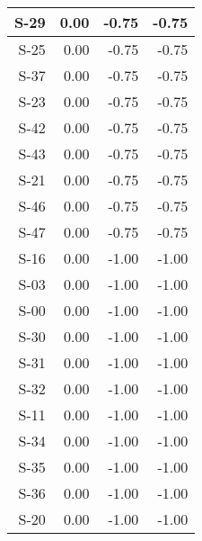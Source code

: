 \begin{tabular}{ | r | r | r | r | }
    \hline
                  S-29  &            0.00  &           -0.75  &           -0.75  \\
    \hline
                  S-25  &            0.00  &           -0.75  &           -0.75  \\
    \hline
                  S-37  &            0.00  &           -0.75  &           -0.75  \\
    \hline
                  S-23  &            0.00  &           -0.75  &           -0.75  \\
    \hline
                  S-42  &            0.00  &           -0.75  &           -0.75  \\
    \hline
                  S-43  &            0.00  &           -0.75  &           -0.75  \\
    \hline
                  S-21  &            0.00  &           -0.75  &           -0.75  \\
    \hline
                  S-46  &            0.00  &           -0.75  &           -0.75  \\
    \hline
                  S-47  &            0.00  &           -0.75  &           -0.75  \\
    \hline
                  S-16  &            0.00  &           -1.00  &           -1.00  \\
    \hline
                  S-03  &            0.00  &           -1.00  &           -1.00  \\
    \hline
                  S-00  &            0.00  &           -1.00  &           -1.00  \\
    \hline
                  S-30  &            0.00  &           -1.00  &           -1.00  \\
    \hline
                  S-31  &            0.00  &           -1.00  &           -1.00  \\
    \hline
                  S-32  &            0.00  &           -1.00  &           -1.00  \\
    \hline
                  S-11  &            0.00  &           -1.00  &           -1.00  \\
    \hline
                  S-34  &            0.00  &           -1.00  &           -1.00  \\
    \hline
                  S-35  &            0.00  &           -1.00  &           -1.00  \\
    \hline
                  S-36  &            0.00  &           -1.00  &           -1.00  \\
    \hline
                  S-20  &            0.00  &           -1.00  &           -1.00  \\

\end{tabular}
